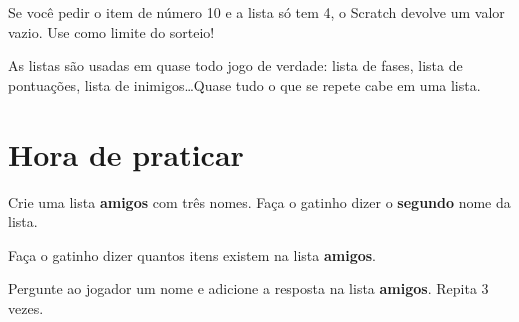\begin{cuidado}
Se você pedir o item de número 10 e a lista só tem 4, o Scratch devolve um valor vazio. Use  como limite do sorteio!
\end{cuidado}

\begin{curiosidade}
As listas são usadas em quase todo jogo de verdade: lista de fases, lista de pontuações, lista de inimigos\ldots Quase tudo o que se repete cabe em uma lista.
\end{curiosidade}

\section{Hora de praticar}

\begin{exercicio}
Crie uma lista \textbf{amigos} com três nomes. Faça o gatinho dizer o \textbf{segundo} nome da lista.
\end{exercicio}

\begin{solucao}
\begin{pilha}
\end{pilha}
\end{solucao}

\begin{exercicio}
Faça o gatinho dizer quantos itens existem na lista \textbf{amigos}.
\end{exercicio}

\begin{solucao}
\begin{pilha}
\end{pilha}
\end{solucao}

\begin{exercicio}
Pergunte ao jogador um nome e adicione a resposta na lista \textbf{amigos}. Repita 3 vezes.
\end{exercicio}


